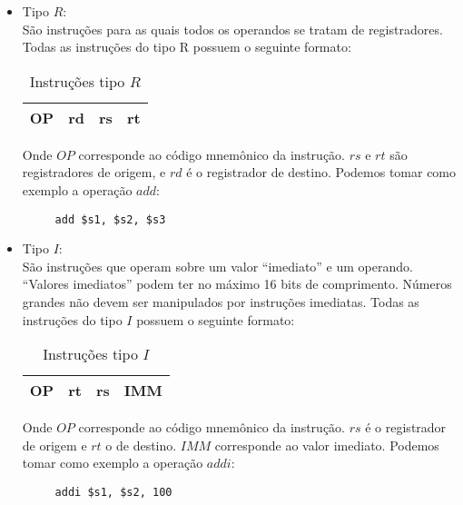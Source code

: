 \begin{itemize}
\item Tipo $R$:\\

São instruções para as quais todos os operandos se tratam de registradores. Todas as instruções do tipo R possuem o seguinte formato:\\

\begin{table}[h]
\centering
\caption{Instruções tipo $R$}
\label{tab:tipo_r}
\begin{tabular}{@{}|l|l|l|l|@{}}
\toprule 
OP & rd & rs & rt \\ \bottomrule
\end{tabular}
\end{table}

Onde $OP$ corresponde ao código mnemônico da instrução. $rs$ e $rt$ são registradores de origem, e $rd$ é o registrador de destino. Podemos tomar como exemplo a operação $add$:\\

\begin{verbatim}
     add $s1, $s2, $s3
\end{verbatim}
\vspace{0.5cm}

\item Tipo $I$:\\
São instruções que operam sobre um valor “imediato” e um operando. “Valores imediatos” podem ter no máximo 16 bits de comprimento. Números grandes não devem ser manipulados por instruções imediatas. Todas as instruções do tipo $I$ possuem o seguinte formato:\\

\begin{table}[h]
\centering
\caption{Instruções tipo $I$}
\label{tab:tipo_i}
\begin{tabular}{@{}|l|l|l|l|@{}}
\toprule 
OP & rt & rs & IMM
 \\ \bottomrule
\end{tabular}
\end{table}

Onde $OP$ corresponde ao código mnemônico da instrução. $rs$ é o registrador de origem e $rt$ o de destino. $IMM$ corresponde ao valor imediato. Podemos tomar como exemplo a operação $addi$:\\

\begin{verbatim}
     addi $s1, $s2, 100
\end{verbatim}
\vspace{0.5cm}


\end{itemize}
